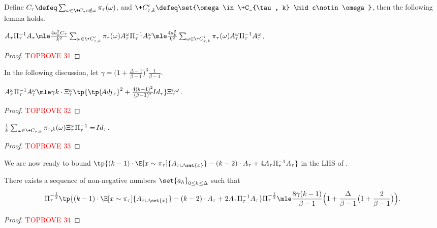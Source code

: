 \documentclass[a4paper,11pt]{article}
\begin{document}
Define $C_\tau\defeq \sum_{\substack{\omega\in \+C_\tau} \\ c\notin \omega}\pi_\tau(\omega)$,
and $\+C'_{\tau, k}\defeq \set{\omega\in \+C_{\tau, k} \mid c\notin\omega}$,
then the following lemma holds.
\begin{lemma}\label{lem:bound-A-tau-i}
 $A_\tau\Pi_\tau^{-1}A_\tau
 \mle
 \frac{4a_k^2C_\tau}{k^2} \sum_{\omega\in\+C'_{\tau, k}} \pi_\tau(\omega) A_\tau^{\omega}\Pi^{-1}_\tau A_\tau^{\omega}
 \mle
 \frac{4a_k^2}{k^2} \sum_{\omega\in\+C'_{\tau, k}} \pi_\tau(\omega) A_\tau^{\omega}\Pi^{-1}_\tau A_\tau^{\omega}$.
\end{lemma}
\begin{proof}\textcolor{red}{TOPROVE 31}\end{proof}

In the following discussion,
let $\gamma=\bigg( 1+ \frac{\Delta-1}{\beta-1} \bigg)^3\frac{1}{\beta-1}$.
\begin{lemma}\label{lem:bound-A-tau-i-omega-square}
	$ A_\tau^{\omega} \Pi_\tau^{-1} A_\tau^{\omega}
    \mle \gamma k\cdot \Xi_\tau^{\omega}\tp{\tp{\!{Adj}_\tau}^2
    +
    \frac{4(k-1)^2}{(\beta-1)^2}\!{Id}_\tau}\Xi_\tau^{i,\omega}$.
\end{lemma}
\begin{proof}\textcolor{red}{TOPROVE 32}\end{proof}

\begin{lemma}\label{lem:bound-Xi-Pi}
$ \frac{1}{k}\sum_{\omega\in \+C_{\tau, k}}\pi_{\tau, k}(\omega)\Xi^\omega_\tau\Pi^{-1}_\tau = \!{Id}_\tau$.
\end{lemma}
\begin{proof}\textcolor{red}{TOPROVE 33}\end{proof}

We are now ready to bound $\tp{(k-1)\cdot \E[x\sim\pi_\tau]{A_{\tau\cup\set{x}}} - (k-2) \cdot A_\tau+4A_\tau \Pi_\tau^{-1} A_\tau}$ in the LHS of .
\begin{lemma}
	\label{lem:bound-A-tau}
	There exists a sequence of non-negative numbers $\set{a_h}_{0\le h\le \Delta}$ such that
	\[
		\Pi_\tau^{-\frac{1}{2}} \tp{(k-1)\cdot \E[x\sim\pi_\tau]{A_{\tau\cup\set{x}}}
        - (k-2) \cdot A_\tau+2A_\tau \Pi_\tau^{-1} A_\tau}
        \Pi_\tau^{-\frac{1}{2}} \mle
        \frac{8\gamma(k-1)}{\beta-1}\Big(1 + \frac{\Delta}{\beta-1}\big(1+\frac{2}{\beta-1}\big)\Big).
	\]
\end{lemma}
\begin{proof}\textcolor{red}{TOPROVE 34}\end{proof}
\end{document}
